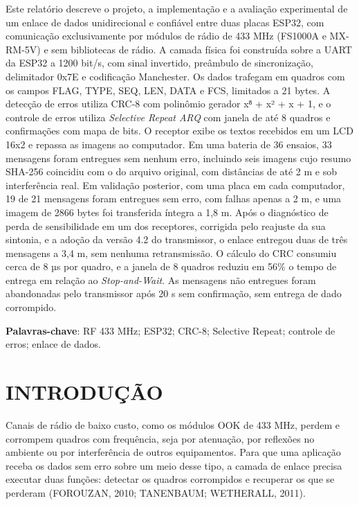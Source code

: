 \documentclass[12pt, oneside, a4paper, sumario=tradicional, chapter=TITLE, brazilian]{abntex2}
\begin{document}
\begin{resumo}
 \SingleSpacing
 Este relatório descreve o projeto, a implementação e a avaliação experimental de um enlace de dados unidirecional e confiável entre duas placas ESP32, com comunicação exclusivamente por módulos de rádio de 433 MHz (FS1000A e MX-RM-5V) e sem bibliotecas de rádio. A camada física foi construída sobre a UART da ESP32 a 1200 bit/s, com sinal invertido, preâmbulo de sincronização, delimitador 0x7E e codificação Manchester. Os dados trafegam em quadros com os campos FLAG, TYPE, SEQ, LEN, DATA e FCS, limitados a 21 bytes. A detecção de erros utiliza CRC-8 com polinômio gerador x⁸ + x² + x + 1, e o controle de erros utiliza \textit{Selective Repeat ARQ} com janela de até 8 quadros e confirmações com mapa de bits. O receptor exibe os textos recebidos em um LCD 16x2 e repassa as imagens ao computador. Em uma bateria de 36 ensaios, 33 mensagens foram entregues sem nenhum erro, incluindo seis imagens cujo resumo SHA-256 coincidiu com o do arquivo original, com distâncias de até 2 m e sob interferência real. Em validação posterior, com uma placa em cada computador, 19 de 21 mensagens foram entregues sem erro, com falhas apenas a 2 m, e uma imagem de 2866 bytes foi transferida íntegra a 1,8 m. Após o diagnóstico de perda de sensibilidade em um dos receptores, corrigida pelo reajuste da sua sintonia, e a adoção da versão 4.2 do transmissor, o enlace entregou duas de três mensagens a 3,4 m, sem nenhuma retransmissão. O cálculo do CRC consumiu cerca de 8 µs por quadro, e a janela de 8 quadros reduziu em 56\% o tempo de entrega em relação ao \textit{Stop-and-Wait}. As mensagens não entregues foram abandonadas pelo transmissor após 20 s sem confirmação, sem entrega de dado corrompido.

 \vspace{\onelineskip}
 \noindent\textbf{Palavras-chave}: RF 433 MHz; ESP32; CRC-8; Selective Repeat; controle de erros; enlace de dados.
\end{resumo}

\listoffigures*
\cleardoublepage
{}
\listoftables*
\cleardoublepage
{}
\tableofcontents*
\cleardoublepage

\textual
\pagestyle{simple}

\chapter{INTRODUÇÃO}
Canais de rádio de baixo custo, como os módulos OOK de 433 MHz, perdem e corrompem quadros com frequência, seja por atenuação, por reflexões no ambiente ou por interferência de outros equipamentos. Para que uma aplicação receba os dados sem erro sobre um meio desse tipo, a camada de enlace precisa executar duas funções: detectar os quadros corrompidos e recuperar os que se perderam (FOROUZAN, 2010; TANENBAUM; WETHERALL, 2011).
\end{document}
